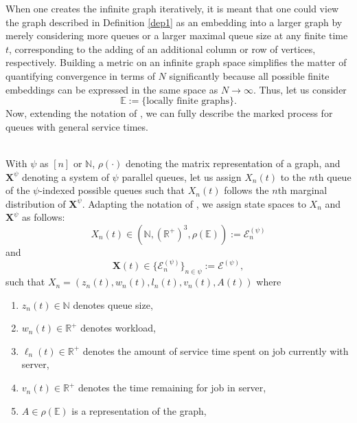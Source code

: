 When one creates the infinite graph iteratively, it is meant that one could view the graph described in Definition \ref{dep1} as an embedding into a larger graph by merely considering more queues or a larger maximal queue size at any finite time $t$, corresponding to the adding of an additional column or row of vertices, respectively. Building a metric on an infinite graph space simplifies the matter of quantifying convergence in terms of $N$ significantly because all possible finite embeddings can be expressed in the same space as $N\rightarrow \infty$. Thus, let us consider \[\mathbb{E}:= \{\text{locally finite graphs}\}.\] Now, extending the notation of \cite{bramson_asymptotic_2012}, we can fully describe the marked process for queues with general service times.
\begin{definition}
    \hfill \\
    With $\psi$ as $[n]$ or $\mathbb{N}$, $\rho(\cdot)$ denoting the matrix representation of a graph, and $\mathbf{X}^{\psi}$ denoting a system of $\psi$ parallel queues,
    let us assign $X_{n}(t)$ to the $n$th queue of the $\psi$-indexed possible queues such that $X_{n}(t)$ follows the $n$th marginal distribution of $\mathbf{X}^{\psi}$.
    Adapting the notation of \cite{bramson_asymptotic_2012}, we assign state spaces to $X_{n}$ and $\mathbf{X}^{\psi}$ as follows:
        \[X_{n}(t)\in (\mathbb{N},\left(\mathbb{R}^{+}\right)^{3},\rho(\mathbb{E})):=\mathcal{E}^{(\psi)}_{n}\]
    and
        \[\mathbf{X}(t) \in \{\mathcal{E}^{(\psi)}_{n}\}_{n \in \psi} := \mathcal{E}^{(\psi)},\]
    such that $X_{n} = (z_{n}(t), w_{n}(t),l_{n}(t),v_{n}(t),A(t))$ where
    \begin{enumerate}
        \item $z_{n}(t) \in \mathbb{N}$ denotes queue size,
        \item $ w_{n}(t) \in \mathbb{R}^{+}$ denotes workload,
        \item $\ell_{n}(t) \in \mathbb{R}^{+}$ denotes the amount of service time spent on job currently with server,
        \item $v_{n}(t) \in \mathbb{R}^{+}$ denotes the time remaining for job in server,
        \item $A \in \rho(\mathbb{E})$ is a representation of the graph,
    \end{enumerate}
    \label{def:spec}
\end{definition}


